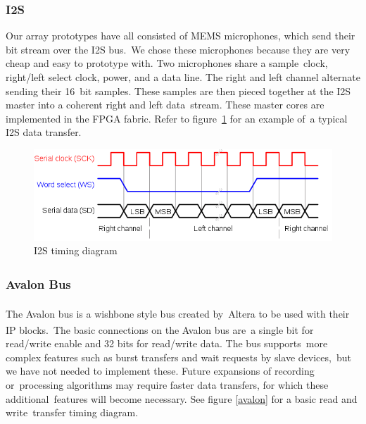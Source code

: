 \documentclass{article}
\begin{document}
\subsubsection{I2S}
Our array prototypes have all consisted of MEMS microphones, which send their bit stream over the I2S bus.\
We chose these microphones because they are very cheap and easy to prototype with. Two microphones share a sample\
clock, right/left select clock, power, and a data line. The right and left channel alternate sending their 16\
bit samples. These samples are then pieced together at the I2S master into a coherent right and left data\
stream. These master cores are implemented in the FPGA fabric. Refer to figure\
\ref{i2s_timing} for an example of\
a typical I2S data transfer.

\begin{figure}[ht]
	\includegraphics[scale=.5]{pictures/i2s_timing.png}
	\centering
	\caption{I2S timing diagram \cite{i2s}}
	\label{i2s_timing}
\end{figure}

\newpage

\subsubsection{Avalon\textsuperscript{\textregistered{}} Bus}
The Avalon\textsuperscript{\textregistered{}} bus is a wishbone style bus created by\
Altera\textsuperscript{\textregistered{}} to be used with their IP blocks.\
The basic connections on the Avalon\textsuperscript{\textregistered{}} bus are\
a single bit for read/write enable and 32 bits for read/write data. The bus supports\
more complex features such as burst transfers and wait requests by slave devices,\
but we have not needed to implement these. Future expansions of recording or\
processing algorithms may require faster data transfers, for which these additional\
features will become necessary.  See figure \ref{avalon} for a basic read and write\
transfer timing diagram.
\end{document}
